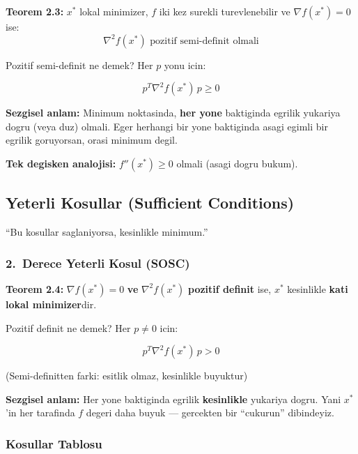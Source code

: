 \documentclass[12pt,a4paper]{article}
\theoremstyle{definition}
\theoremstyle{remark}
\begin{document}
\begin{onemli}
\textbf{Teorem 2.3:} $x^*$ lokal minimizer, $f$ iki kez surekli turevlenebilir ve $\nabla f(x^*) = 0$ ise:
\[
\boxed{\nabla^2 f(x^*) \text{ pozitif semi-definit olmali}}
\]
\end{onemli}

Pozitif semi-definit ne demek? Her $p$ yonu icin:

\[
p^T \nabla^2 f(x^*) \, p \geq 0
\]

\textbf{Sezgisel anlam:} Minimum noktasinda, \textbf{her yone} baktiginda egrilik yukariya dogru (veya duz) olmali. Eger herhangi bir yone baktiginda asagi egimli bir egrilik goruyorsan, orasi minimum degil.

\textbf{Tek degisken analojisi:} $f''(x^*) \geq 0$ olmali (asagi dogru bukum).

\subsection{Yeterli Kosullar (Sufficient Conditions)}

``Bu kosullar saglaniyorsa, kesinlikle minimum.''

\subsubsection{2.\ Derece Yeterli Kosul (SOSC)}

\begin{onemli}
\textbf{Teorem 2.4:} $\nabla f(x^*) = 0$ \textbf{ve} $\nabla^2 f(x^*)$ \textbf{pozitif definit} ise, $x^*$ kesinlikle \textbf{kati lokal minimizer}dir.
\end{onemli}

Pozitif definit ne demek? Her $p \neq 0$ icin:

\[
p^T \nabla^2 f(x^*) \, p > 0
\]

(Semi-definitten farki: esitlik olmaz, kesinlikle buyuktur)

\textbf{Sezgisel anlam:} Her yone baktiginda egrilik \textbf{kesinlikle} yukariya dogru. Yani $x^*$'in her tarafinda $f$ degeri daha buyuk --- gercekten bir ``cukurun'' dibindeyiz.

\subsubsection{Kosullar Tablosu}
\end{document}

